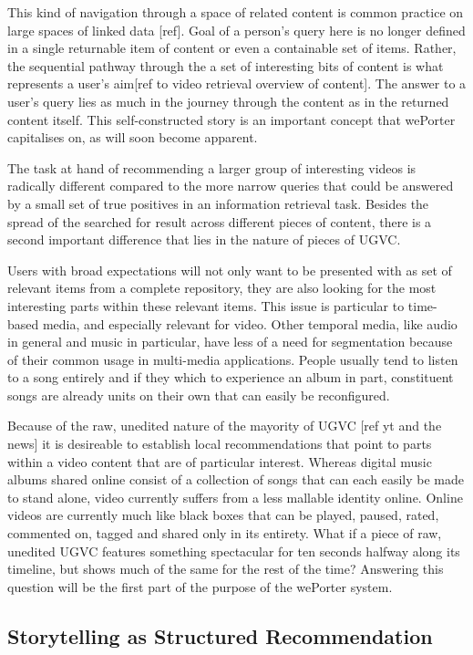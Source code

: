 This kind of navigation through a space of related content is common practice on large spaces of linked data [ref]. Goal of a person's query here is no longer defined in a single returnable item of content or even a containable set of items. Rather, the sequential pathway through the a set of interesting bits of content is what represents a user's aim[ref to video retrieval overview of content]. The answer to a user's query lies as much in the journey through the content as in the returned content itself. This self-constructed story is an important concept that wePorter capitalises on, as will soon become apparent.

The task at hand of recommending a larger group of interesting videos is radically different compared to the more narrow queries that could be answered by a small set of true positives in an information retrieval task. Besides the spread of the searched for result across different pieces of content, there is a second important difference that lies in the nature of pieces of UGVC.

Users with broad expectations will not only want to be presented with as set of relevant items from a complete repository, they are also looking for the most interesting parts within these relevant items. This issue is particular to time-based media, and especially relevant for video. Other temporal media, like audio in general and music in particular, have less of a need for segmentation because of  their common usage in multi-media applications. People usually tend to listen to a song entirely and if they which to experience an album in part, constituent songs are already units on their own that can easily be reconfigured.

Because of the raw, unedited nature of the mayority of UGVC [ref yt and the news] it is desireable to establish local recommendations that point to parts within a video content that are of particular interest. Whereas digital music albums shared online consist of a collection of songs that can each easily be made to stand alone, video currently suffers from a less mallable identity online.  Online videos are currently much like black boxes that can be played, paused, rated, commented on, tagged and shared only in its entirety. What if a piece of raw, unedited UGVC features something spectacular for ten seconds halfway along its timeline, but shows much of the same for the rest of the time? Answering this question will be the first part of the purpose of the wePorter system.

\subsection{Storytelling as Structured Recommendation}

